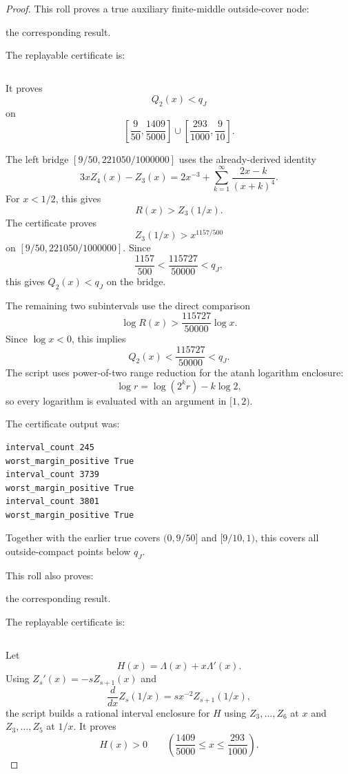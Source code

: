 \begin{proof}
This roll proves a true auxiliary finite-middle outside-cover node:

the corresponding result.

The replayable certificate is:

\begin{verbatim}
\end{verbatim}

It proves
\[
Q_2(x)<q_J
\]
on
\[
\left[\frac9{50},\frac{1409}{5000}\right]
\cup
\left[\frac{293}{1000},\frac9{10}\right].
\]

The left bridge \([9/50,221050/1000000]\) uses the already-derived identity
\[
3xZ_4(x)-Z_3(x)
=2x^{-3}+\sum_{k=1}^{\infty}\frac{2x-k}{(x+k)^4}.
\]
For \(x<1/2\), this gives
\[
R(x)>Z_3(1/x).
\]
The certificate proves
\[
Z_3(1/x)>x^{1157/500}
\]
on \([9/50,221050/1000000]\). Since
\[
\frac{1157}{500}<\frac{115727}{50000}<q_J,
\]
this gives \(Q_2(x)<q_J\) on the bridge.

The remaining two subintervals use the direct comparison
\[
\log R(x)>\frac{115727}{50000}\log x.
\]
Since \(\log x<0\), this implies
\[
Q_2(x)<\frac{115727}{50000}<q_J.
\]
The script uses power-of-two range reduction for the atanh logarithm enclosure:
\[
\log r=\log(2^k r)-k\log 2,
\]
so every logarithm is evaluated with an argument in \([1,2)\).

The certificate output was:

\begin{verbatim}
interval_count 245
worst_margin_positive True
interval_count 3739
worst_margin_positive True
interval_count 3801
worst_margin_positive True
\end{verbatim}

Together with the earlier true covers \((0,9/50]\) and \([9/10,1)\), this covers all outside-compact points below \(q_J\).

This roll also proves:

the corresponding result.

The replayable certificate is:

\begin{verbatim}
\end{verbatim}

Let
\[
H(x)=\Lambda(x)+x\Lambda'(x).
\]
Using \(Z_s'(x)=-sZ_{s+1}(x)\) and
\[
\frac{d}{dx}Z_s(1/x)=s x^{-2} Z_{s+1}(1/x),
\]
the script builds a rational interval enclosure for \(H\) using \(Z_3,\ldots,Z_6\) at \(x\) and \(Z_3,\ldots,Z_5\) at \(1/x\). It proves
\[
H(x)>0
\qquad
\left(\frac{1409}{5000}\le x\le\frac{293}{1000}\right).
\]


\end{proof}
